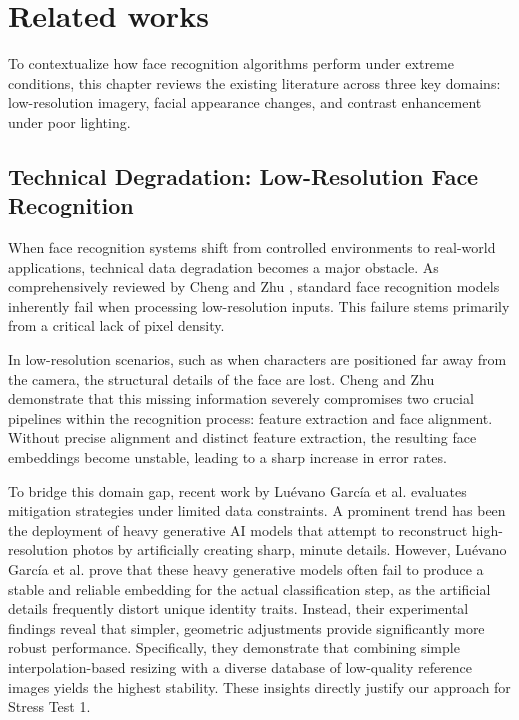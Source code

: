\documentclass{article}
\begin{document}
\section{Related works}

To contextualize how face recognition algorithms perform under extreme conditions, this chapter reviews the existing literature across three key domains: low-resolution imagery, facial appearance changes, and contrast enhancement under poor lighting.

\subsection{Technical Degradation: Low-Resolution Face Recognition}
When face recognition systems shift from controlled environments to real-world applications, technical data degradation becomes a major obstacle. As comprehensively reviewed by Cheng and Zhu \cite{cheng2024}, standard face recognition models inherently fail when processing low-resolution inputs. This failure stems primarily from a critical lack of pixel density.

In low-resolution scenarios, such as when characters are positioned far away from the camera, the structural details of the face are lost. Cheng and Zhu \cite{cheng2024} demonstrate that this missing information severely compromises two crucial pipelines within the recognition process: feature extraction and face alignment. Without precise alignment and distinct feature extraction, the resulting face embeddings become unstable, leading to a sharp increase in error rates.

To bridge this domain gap, recent work by Luévano García et al. \cite{luevano2026} evaluates mitigation strategies under limited data constraints. A prominent trend has been the deployment of heavy generative AI models that attempt to reconstruct high-resolution photos by artificially creating sharp, minute details. However, Luévano García et al. \cite{luevano2026} prove that these heavy generative models often fail to produce a stable and reliable embedding for the actual classification step, as the artificial details frequently distort unique identity traits. Instead, their experimental findings reveal that simpler, geometric adjustments provide significantly more robust performance. Specifically, they demonstrate that combining simple interpolation-based resizing with a diverse database of low-quality reference images yields the highest stability. These insights directly justify our approach for Stress Test 1.
\end{document}
